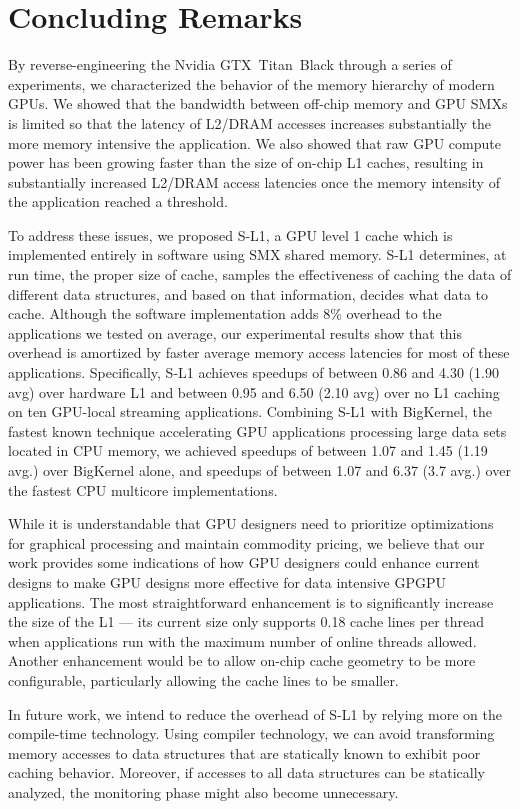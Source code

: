 \section{Concluding Remarks}
\label{sec:conclusion}

By reverse-engineering the Nvidia GTX~Titan~Black through a series of experiments, we characterized the behavior of the memory hierarchy of modern GPUs.
We showed that the bandwidth between off-chip memory and GPU SMXs is limited so that the latency of L2/DRAM accesses increases substantially the more memory intensive the application.
We also showed that raw GPU compute power has been growing faster than the size of on-chip
L1 caches, resulting in substantially increased L2/DRAM access latencies once the memory intensity of the application reached a threshold.

To address these issues, we proposed S-L1, a GPU level 1 cache which is implemented entirely in software using SMX shared memory.
S-L1 determines, at run time, the proper size of cache, samples the effectiveness of caching the data of different data structures, and based on that information, decides what data to cache.
Although the software implementation adds 8\% overhead to the applications we tested on average, our experimental results show that this overhead is amortized by faster average memory access latencies for most of these applications.
Specifically, S-L1 achieves speedups of between 0.86 and 4.30 (1.90 avg) over hardware L1 and between 0.95 and 6.50 (2.10 avg) over no L1 caching on ten GPU-local streaming applications.
Combining S-L1 with BigKernel, the fastest known technique accelerating GPU applications processing
large data sets located in CPU memory, we achieved speedups of between 1.07 and 1.45 (1.19 avg.) over
BigKernel alone, and speedups of between 1.07 and 6.37 (3.7 avg.) over the fastest CPU multicore implementations.

While it is understandable that GPU designers need to prioritize optimizations for graphical
processing and maintain commodity pricing, we believe that our work provides some indications of how
GPU designers could enhance current designs to make GPU designs more effective for data
intensive GPGPU applications.
The most straightforward enhancement is to significantly increase the size of the L1 --- its current size
only supports 0.18 cache lines per thread when applications run with the maximum number of online threads allowed.
Another enhancement would be to allow on-chip cache geometry to be more configurable, particularly allowing the cache
lines to be smaller.


In future work,  we intend to reduce the overhead of S-L1 by relying more on the compile-time technology. 
Using compiler technology, we can avoid transforming memory accesses to data structures that are statically known to exhibit poor caching behavior. 
Moreover, if accesses to all data structures can be statically analyzed, the monitoring phase might also become unnecessary.

